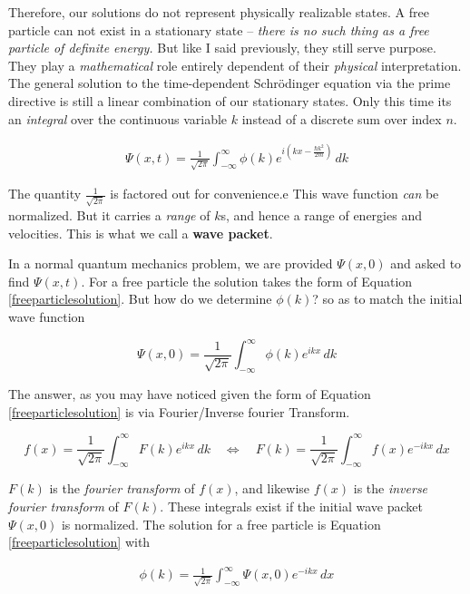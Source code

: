Therefore, our solutions do not represent physically realizable states. A free
particle can not exist in a stationary state -- \textit{ there is no such thing
as a free particle of definite energy.} But like I said previously, they still
serve purpose. They play a \textit{mathematical} role entirely dependent of
their \textit{physical} interpretation. The general solution to the
time-dependent Schr\"odinger equation via the prime directive is still a linear
combination of our stationary states. Only this time its an \textit{integral}
over the continuous variable $k$ instead of a discrete sum over index $n$. 

\begin{align} \label{freeparticlesolution}
  \Psi(x, t) = \frac{1}{\sqrt{2\pi}}\int_{-\infty}^{\infty} \phi(k) e^{i\left(
  kx - \frac{\hbar k^2}{2m}\right) } \, dk 
\end{align}\vspace{3px}

The quantity $\frac{1}{\sqrt{2\pi}}$ is factored out for convenience.e This
wave function \textit{can} be normalized. But it carries a \textit{range} of
$k$s, and hence a range of energies and velocities. This is what we call
a \textbf{wave packet}.  

In a normal quantum mechanics problem, we are provided $\Psi(x, 0)$ and asked
to find $\Psi(x, t)$. For a free particle the solution takes the form of
Equation \ref{freeparticlesolution}. But how do we determine $\phi(k)$? so as
to match the initial wave function

\[
  \Psi(x, 0) = \frac{1}{\sqrt{2\pi}} \int_{-\infty}^{\infty} \phi(k)e^{ikx} \,
  dk
\] \vspace{3px}

The answer, as you may have noticed given the form of Equation
\ref{freeparticlesolution} is via Fourier/Inverse fourier Transform. 

\[\boxed{
  f(x) = \frac{1}{\sqrt{2\pi}}\int_{-\infty}^{\infty} F(k)e^{ikx} \, dk \quad
  \Longleftrightarrow \quad F(k) = \frac{1}{\sqrt{2\pi}} \int_{-\infty}^{\infty}
f(x) e^{-ikx} \, dx}
\] \vspace{3px}


$F(k)$ is the \textit{fourier transform} of $f(x)$, and likewise $f(x)$ is the
\textit{inverse fourier transform} of $F(k)$. These integrals exist if the
initial wave packet $\Psi(x, 0)$ is normalized. The solution for a free
particle is Equation \ref{freeparticlesolution} with 

\begin{align} \label{solvingphi}
  \phi(k) = \frac{1}{\sqrt{2\pi}} \int_{-\infty}^{\infty} \Psi(x, 0)e^{-ikx} \,
  dx
\end{align}\vspace{3px}

